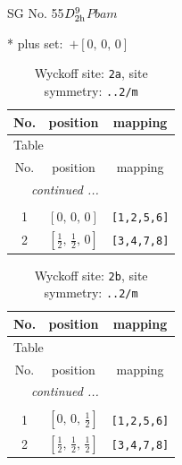 \documentclass[fleqn,8pt]{jsarticle}
\begin{document}
\setcounter{MaxMatrixCols}{32}

\renewcommand{\tablename}{Table~}
\renewcommand{\figurename}{Figure~}
\begin{center}
\LARGE
SG No. 55\quad$D_{\rm 2h}^{9}$\quad$Pbam$\quad[ orthorhombic ]
\end{center}
* plus set:\,\,\,$+\left[ 0,\, 0,\, 0 \right]$
\renewcommand{\arraystretch}{1.2}
\begin{longtable}{ccc}
\caption{Wyckoff site: {\tt 2a}, site symmetry: {\tt ..2/m}}
 \\
 \hline \hline
No. & position & mapping \\ \hline \endfirsthead

\multicolumn{2}{l}{\tablename\ \thetable{}} \\
 \hline \hline
No. & position & mapping \\ \hline \endhead

 \hline \hline
\multicolumn{2}{r}{\footnotesize\it continued ...} \\ \endfoot

 \hline \hline
\multicolumn{2}{r}{} \\ \endlastfoot

1 & $\left[ 0,\, 0,\, 0 \right]$ & {\tt [1,2,5,6]} \\ \hline
2 & $\left[ \frac{1}{2},\, \frac{1}{2},\, 0 \right]$ & {\tt [3,4,7,8]} \\
\end{longtable}
\renewcommand{\arraystretch}{1.2}
\begin{longtable}{ccc}
\caption{Wyckoff site: {\tt 2b}, site symmetry: {\tt ..2/m}}
 \\
 \hline \hline
No. & position & mapping \\ \hline \endfirsthead

\multicolumn{2}{l}{\tablename\ \thetable{}} \\
 \hline \hline
No. & position & mapping \\ \hline \endhead

 \hline \hline
\multicolumn{2}{r}{\footnotesize\it continued ...} \\ \endfoot

 \hline \hline
\multicolumn{2}{r}{} \\ \endlastfoot

1 & $\left[ 0,\, 0,\, \frac{1}{2} \right]$ & {\tt [1,2,5,6]} \\ \hline
2 & $\left[ \frac{1}{2},\, \frac{1}{2},\, \frac{1}{2} \right]$ & {\tt [3,4,7,8]} \\
\end{longtable}
\end{document}
